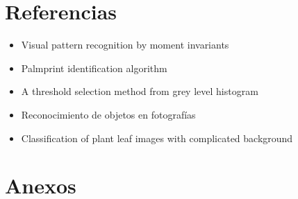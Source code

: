 \documentclass[letter]{article}
\begin{document}
\section{Referencias}
\label{sec:org7eccd8d}
\begin{itemize}
\item Visual pattern recognition by moment invariants
\item Palmprint identification algorithm
\item A threshold selection method from grey level histogram
\item Reconocimiento de objetos en fotografías
\item Classification of plant leaf images with complicated background
\end{itemize}

\section{Anexos}
\label{sec:org2e966b8}
\end{document}
